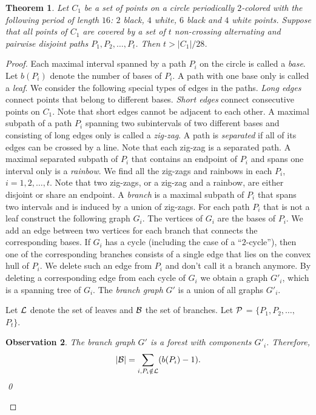 \documentclass[12pt]{article}
\newtheorem{theorem}{Theorem}[section]
\newtheorem{obs}[theorem]{Observation}
\begin{document}
\begin{theorem}\label{t:circle_covering}
Let $C_1$ be a set of points on a circle periodically $2$-colored with the following period of length $16$:
$2$ black, $4$ white, $6$ black and $4$ white points.
Suppose that all points of $C_1$ are covered by a set of $t$ non-crossing alternating and pairwise disjoint paths $P_1, P_2,\dots, P_t$. Then $t > |C_1|/28$.
\end{theorem}

\begin{proof}
Each maximal interval spanned by a path $P_i$ on the circle is called a {\em base}. Let $b(P_i)$ denote the number of bases of $P_i$. A path with one base only is called a {\em leaf}. We consider the following special types of edges in the paths. {\em Long edges\/} connect points that belong to different bases. {\em Short edges\/} connect consecutive points on $C_1$. Note that short edges cannot be adjacent to each other. A maximal subpath of a path $P_i$ spanning two subintervals of two different bases and consisting of long edges only is called a {\em zig-zag}. A path is {\em separated\/} if all of its edges can be crossed by a line. Note that each zig-zag is a separated path. A maximal separated subpath of $P_i$ that contains an endpoint of $P_i$ and spans one interval only is a {\em rainbow\/}. We find all the zig-zags and rainbows in each $P_i$, $i=1,2,\dots, t$. Note that two zig-zags, or a zig-zag and a rainbow, are either disjoint or share an endpoint.
A {\em branch\/} is a maximal subpath of $P_i$ that spans two intervals and is induced by a union of zig-zags. 
For each path $P_i$ that is not a leaf construct the following graph $G_i$. The vertices of $G_i$ are the bases of $P_i$. We add an edge between two vertices for each branch that connects the corresponding bases.
If $G_i$ has a cycle (including the case of a ``$2$-cycle''), then one of the corresponding branches consists of a single edge that lies on the convex hull of $P_i$. We delete such an edge from $P_i$ and don't call it a branch anymore. By deleting a corresponding edge from each cycle of $G_i$ we obtain a graph $G'_i$, which is a spanning tree of $G_i$. The {\em branch graph} $G'$ is a union of all graphs $G'_i$.
 
Let ${\cal L }$ denote the set of leaves and ${\cal B }$ the set of branches. Let ${\cal P}$ = $\{P_1, P_2,\dots,$ $P_t\}$.

\begin{obs}\label{o:branches}
The branch graph $G'$ is a forest with components $G'_i$. Therefore, $$|{\cal B}|= \sum_{i, P_i \notin {\cal L}} (b(P_i)-1).$$ \qed
\end{obs}


\end{proof}
\end{document}
